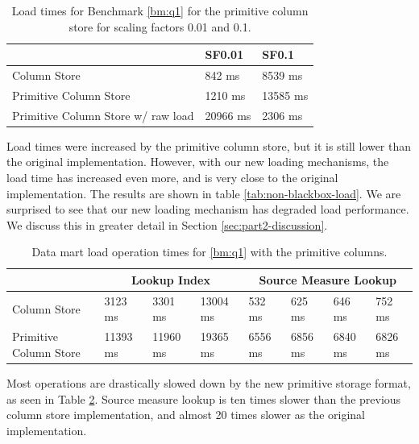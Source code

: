 \begin{table}
    \centering
    \begin{tabularx}{0.75\textwidth}{X | X X}
        & SF0.01 & SF0.1 \\ 
        \hline
        \hline
        Column Store & 842 ms & 8539 ms \\
        Primitive Column Store & 1210 ms & 13585 ms \\
        Primitive Column Store w/ raw load &  20966 ms & 2306 ms \\
    \end{tabularx}
    \caption{Load times for Benchmark \ref{bm:q1} for the primitive column store for scaling factors 0.01 and 0.1.} 
    \label{tab:primitive-load}
\end{table}
Load times were increased by the primitive column store, but it is still lower than the original implementation. However, with our new loading mechanisms, the load time has increased even more, and is very close to the original implementation. The results are shown in table \ref{tab:non-blackbox-load}. We are surprised to see that our new loading mechanism has degraded load performance. We discuss this in greater detail in Section \ref{sec:part2-discussion}. 

\begin{table}
    \centering
    \begin{tabularx}{\textwidth}{X | X X X | X X X X}
        & \multicolumn{3}{c}{Lookup Index} & \multicolumn{4}{c}{Source Measure Lookup} \\
        \hline
        \hline
        Column Store & 3123 ms & 3301 ms & 13004 ms & 532 ms & 625 ms & 646 ms & 752 ms \\
        Primitive Column Store & 11393 ms & 11960 ms & 19365 ms & 6556 ms & 6856 ms & 6840 ms & 6826 ms \\
    \end{tabularx}
    \caption{Data mart load operation times for \ref{bm:q1} with the primitive columns.} 
    \label{tab:primitive-q1}
\end{table}
Most operations are drastically slowed down by the new primitive storage format, as seen in Table \ref{tab:primitive-q1}. Source measure lookup is ten times slower than the previous column store implementation, and almost 20 times slower as the original implementation.

